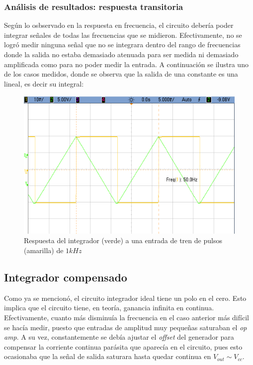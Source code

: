 \documentclass[../../main.tex]{subfiles}
\begin{document}
\subsubsection{An\'alisis de resultados: respuesta transitoria}
Seg\'un lo osbservado en la respuesta en frecuencia, el circuito deber\'ia poder integrar se\~nales de todas las frecuencias que se midieron. Efectivamente, no se logr\'o medir ninguna se\~nal que no se integrara dentro del rango de frecuencias donde la salida no estaba demasiado atenuada para ser medida ni demasiado amplificada como para no poder medir la entrada.  A continuaci\'on se ilustra uno de los casos medidos, donde se observa que la salida de una constante es una lineal, es decir su integral:

\begin{figure}  [H]
	\centering
	\label{fig:i-1k}
	\includegraphics[scale=0.4]{fotos/tc_tp2_ej4_i_50.png}
	\caption{Respuesta del integrador (verde) a una entrada de tren de pulsos (amarilla) de $1kHz$}
\end{figure}





\subsection{Integrador compensado}

Como ya se mencion\'o, el circuito integrador ideal tiene un polo en el cero. Esto implica que el circuito tiene, en teor\'ia, ganancia infinita en continua. Efectivamente, cuanto m\'as disminu\'ia la frecuencia en el caso anterior m\'as dif\'icil se hac\'ia medir, puesto que entradas de amplitud muy peque\~nas saturaban el \textit{op amp}. A su vez, constantemente se deb\'ia ajustar el \textit{offset} del generador para compensar la corriente continua par\'asita que aparec\'ia en el circuito, pues esto ocasionaba que la se\~nal de salida saturara hasta quedar continua en $V_{out} \sim V_{cc}$. \par
\end{document}
